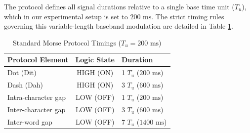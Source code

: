 \documentclass[conference]{IEEEtran}
\begin{document}
The protocol defines all signal durations relative to a single base time unit ($T_u$), which in our experimental setup is set to $200\text{ ms}$. The strict timing rules governing this variable-length baseband modulation are detailed in Table \ref{tab:morse_timing}. 

\begin{table}[htbp]
\caption{Standard Morse Protocol Timings ($T_u = 200\text{ ms}$)}
\label{tab:morse_timing}
\centering
\begin{tabular}{|l|c|l|}
\hline
\textbf{Protocol Element} & \textbf{Logic State} & \textbf{Duration} \\ \hline
Dot (Dit)                 & HIGH (ON)            & 1 $T_u$ ($200\text{ ms}$) \\ \hline
Dash (Dah)                & HIGH (ON)            & 3 $T_u$ ($600\text{ ms}$) \\ \hline
Intra-character gap       & LOW (OFF)            & 1 $T_u$ ($200\text{ ms}$) \\ \hline
Inter-character gap       & LOW (OFF)            & 3 $T_u$ ($600\text{ ms}$) \\ \hline
Inter-word gap            & LOW (OFF)            & 7 $T_u$ ($1400\text{ ms}$) \\ \hline
\end{tabular}
\end{table}
\end{document}
